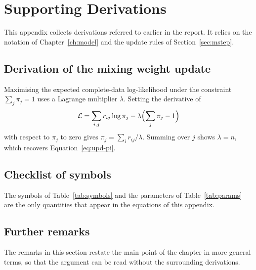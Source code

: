 \chapter{Supporting Derivations}\label{ch:appendix}

This appendix collects derivations referred to earlier in the report. It
relies on the notation of Chapter~\ref{ch:model} and the update rules of
Section~\ref{sec:mstep}.

\section{Derivation of the mixing weight update}\label{sec:derive-pi}

Maximising the expected complete-data log-likelihood under the constraint
$\sum_j \pi_j = 1$ uses a Lagrange multiplier $\lambda$. Setting the derivative
of
\begin{equation}\label{eq:lagrange}
  \mathcal{L} = \sum_{i,j} r_{ij}\log \pi_j - \lambda\Bigl(\sum_j \pi_j - 1\Bigr)
\end{equation}
with respect to $\pi_j$ to zero gives $\pi_j = \sum_i r_{ij}/\lambda$. Summing
over $j$ shows $\lambda = n$, which recovers Equation~\eqref{eq:upd-pi}.

\lipsum[47-48]

\section{Checklist of symbols}\label{sec:checklist}

The symbols of Table~\ref{tab:symbols} and the parameters of
Table~\ref{tab:params} are the only quantities that appear in the
equations of this appendix.

\lipsum[49-50]

\section{Further remarks}\label{sec:further-appendix}

The remarks in this section restate the main point of the chapter in more
general terms, so that the argument can be read without the surrounding
derivations.

\lipsum[135-146]
